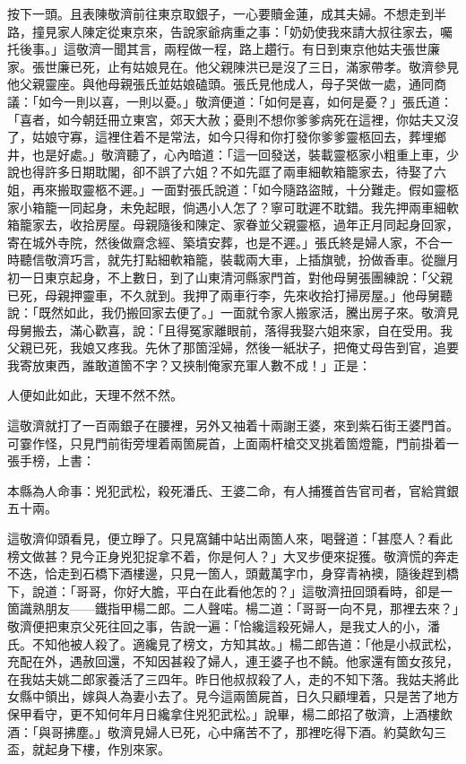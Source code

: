 按下一頭。且表陳敬濟前往東京取銀子，一心要贖金蓮，成其夫婦。不想走到半路，撞見家人陳定從東京來，告說家爺病重之事：「奶奶使我來請大叔往家去，囑托後事。」這敬濟一聞其言，兩程做一程，路上趲行。有日到東京他姑夫張世廉家。張世廉已死，止有姑娘見在。他父親陳洪已是沒了三日，滿家帶孝。敬濟參見他父親靈座。與他母親張氏並姑娘磕頭。張氏見他成人，母子哭做一處，通同商議：「如今一則以喜，一則以憂。」{}敬濟便道：「如何是喜，如何是憂？」張氏道：「喜者，如今朝廷冊立東宮，郊天大赦；憂則不想你爹爹病死在這裡，你姑夫又沒了，姑娘守寡，這裡住着不是常法，如今只得和你打發你爹爹靈柩回去，葬埋鄉井，也是好處。」敬濟聽了，心內暗道：「這一回發送，裝載靈柩家小粗重上車，少說也得許多日期耽閣，卻不誤了六姐？{}不如先誆了兩車細軟箱籠家去，待娶了六姐，再來搬取靈柩不遲。」一面對張氏說道：「如今隨路盜賊，十分難走。假如靈柩家小箱籠一同起身，未免起眼，倘遇小人怎了？寧可耽遲不耽錯。我先押兩車細軟箱籠家去，收拾房屋。母親隨後和陳定、家眷並父親靈柩，過年正月同起身回家，寄在城外寺院，然後做齋念經、築墳安葬，也是不遲。」張氏終是婦人家，不合一時聽信敬濟巧言，就先打點細軟箱籠，裝載兩大車，上插旗號，扮做香車。從臘月初一日東京起身，不上數日，到了山東清河縣家門首，對他母舅張團練說：「父親已死，母親押靈車，不久就到。我押了兩車行李，先來收拾打掃房屋。」他母舅聽說：「既然如此，我仍搬回家去便了。」一面就令家人搬家活，騰出房子來。敬濟見母舅搬去，滿心歡喜，說：「且得冤家離眼前，落得我娶六姐來家，自在受用。我父親已死，我娘又疼我。先休了那箇淫婦，然後一紙狀子，把俺丈母告到官，追要我寄放東西，誰敢道箇不字？{}又挾制俺家充軍人數不成！」正是：

\begin{myquote}
人便如此如此，天理不然不然。
\end{myquote}

這敬濟就打了一百兩銀子在腰裡，另外又袖着十兩謝王婆，來到紫石街王婆門首。可霎作怪，只見門前街旁埋着兩箇屍首，上面兩杆槍交叉挑着箇燈籠，門前掛着一張手榜，上書：

\begin{myquote}[\markfont]
本縣為人命事：兇犯武松，殺死潘氏、王婆二命，有人捕獲首告官司者，官給賞銀五十兩。
\end{myquote}

這敬濟仰頭看見，便立睜了。只見窩鋪中站出兩箇人來，喝聲道：「甚麼人？看此榜文做甚？見今正身兇犯捉拿不着，你是何人？」大叉步便來捉獲。敬濟慌的奔走不迭，恰走到石橋下酒樓邊，只見一箇人，頭戴萬字巾，身穿青衲襖，隨後趕到橋下，說道：「哥哥，你好大膽，平白在此看他怎的？」這敬濟扭回頭看時，卻是一箇識熟朋友——鐵指甲楊二郎。二人聲喏。楊二道：「哥哥一向不見，那裡去來？」敬濟便把東京父死往回之事，告說一遍：「恰纔這殺死婦人，是我丈人的小，潘氏。不知他被人殺了。適纔見了榜文，方知其故。」楊二郎告道：「他是小叔武松，充配在外，遇赦回還，不知因甚殺了婦人，連王婆子也不饒。他家還有箇女孩兒，在我姑夫姚二郎家養活了三四年。昨日他叔叔殺了人，走的不知下落。我姑夫將此女縣中領出，嫁與人為妻小去了。{}見今這兩箇屍首，日久只顧埋着，只是苦了地方保甲看守，更不知何年月日纔拿住兇犯武松。」說畢，楊二郎招了敬濟，上酒樓飲酒：「與哥拂塵。」敬濟見婦人已死，心中痛苦不了，那裡吃得下酒。約莫飲勾三盃，就起身下樓，作別來家。

